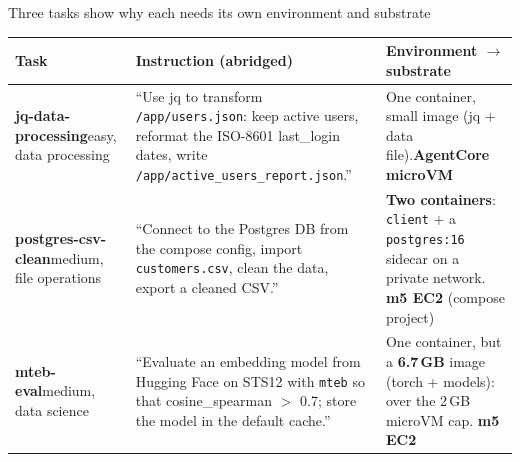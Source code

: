 \begin{frame}{Three tasks show why each needs its own environment and substrate}
\scriptsize\setlength{\tabcolsep}{3pt}
\begin{tabular}{@{}P{0.17\textwidth} P{0.47\textwidth} P{0.30\textwidth}@{}}
\toprule
\textbf{Task} & \textbf{Instruction (abridged)} & \textbf{Environment $\rightarrow$ substrate}\\
\midrule
\textbf{jq-data-processing}\newline\textcolor{inkmuted}{easy, data processing} &
``Use jq to transform \texttt{/app/users.json}: keep active users, reformat the ISO-8601 last\_login
dates, write \texttt{/app/active\_users\_report.json}.'' &
One container, small image (jq + data file).\newline\textcolor{cat2}{\textbf{AgentCore microVM}}\\[1mm]
\textbf{postgres-csv-clean}\newline\textcolor{inkmuted}{medium, file operations} &
``Connect to the Postgres DB from the compose config, import \texttt{customers.csv}, clean the data,
export a cleaned CSV.'' &
\textbf{Two containers}: \texttt{client} + a \texttt{postgres:16} sidecar on a private network.\newline
\textcolor{cat1}{\textbf{m5 EC2}} (compose project)\\[1mm]
\textbf{mteb-eval}\newline\textcolor{inkmuted}{medium, data science} &
``Evaluate an embedding model from Hugging Face on STS12 with \texttt{mteb} so that cosine\_spearman
$>$ 0.7; store the model in the default cache.'' &
One container, but a \textbf{6.7\,GB} image (torch + models): over the 2\,GB microVM cap.\newline
\textcolor{cat1}{\textbf{m5 EC2}}\\
\bottomrule
\end{tabular}
\par\vspace{2mm}
\end{frame}

